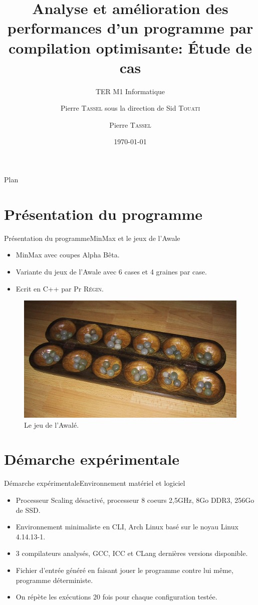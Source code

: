 \documentclass{beamer}
\title{Analyse et amélioration des performances d'un programme par compilation optimisante: Étude de cas}
\subtitle{TER M1 Informatique}
\author{Pierre \textsc{Tassel} sous la direction de Sid \textsc{Touati}}
\institute[Universitée Nice Sophia Antipolis] 
{Département Informatique\\
Universitée Nice Sophia Antipolis
\and
Master Informatique}
\date{\today}
\begin{document}
\author{Pierre \textsc{Tassel}}
\begin{frame}
  \titlepage
\end{frame}

\begin{frame}{Plan}
  \tableofcontents
\end{frame}

\section{Présentation du programme}

\begin{frame}{Présentation du programme}{MinMax et le jeux de l'Awale}
\begin{itemize}
  \item
    MinMax avec coupes Alpha Bêta.
  \item
    Variante du jeux de l'Awale avec 6 cases et 4 graines par case.
  \item
    Ecrit en C++ par Pr \textsc{Régin}.
  \end{itemize}
  \begin{figure}
   \includegraphics[width= 0.7\linewidth, keepaspectratio]{Awale.jpg}
   \caption{Le jeu de l'Awalé.\label{Fig:awale}}
\end{figure}
\end{frame}

\section{Démarche expérimentale}
\begin{frame}{Démarche expérimentale}{Environnement matériel et logiciel}
\begin{itemize}
  \item
  	Processeur Scaling désactivé, processeur 8 coeurs 2,5GHz, 8Go DDR3, 256Go de SSD.
  \item
    Environnement minimaliste en CLI, Arch Linux basé sur le noyau Linux 4.14.13-1.
    \item
    3 compilateurs analysés, GCC, ICC et CLang dernières versions disponible.
    \item
    Fichier d'entrée généré en faisant jouer le programme contre lui même, programme déterministe.
    \item
    On répète les exécutions 20 fois pour chaque configuration testée.
\end{itemize}
\end{frame}
\end{document}
